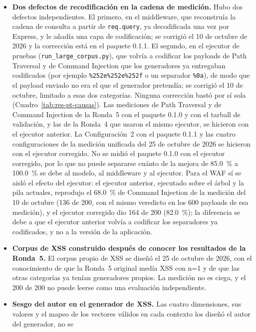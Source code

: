 \begin{itemize}
    evaluación estrictamente ciega; el paquete 0.1.1 contiene el mismo par.
    \item \textbf{Dos defectos de recodificación en la cadena de medición.} Hubo dos defectos
    independientes. El primero, en el middleware, que reconstruía la cadena de consulta a partir de
    \texttt{req.query}, ya decodificada una vez por Express, y le añadía una capa de codificación;
    se corrigió el 10 de octubre de 2026 y la corrección está en el paquete 0.1.1. El segundo, en el
    ejecutor de pruebas (\texttt{run\_large\_corpus.py}), que volvía a codificar los payloads de
    Path Traversal y de Command Injection que los generadores ya entregaban codificados (por
    ejemplo \texttt{\%252e\%252e\%252f} o un separador \texttt{\%0a}), de modo que el payload enviado
    no era el que el generador pretendía; se corrigió el 10 de octubre, limitado a esas dos
    categorías. Ninguna corrección bastó por sí sola (Cuadro~\ref{tab:res-pt-causas}). Las mediciones de
    Path Traversal y de Command Injection de la Ronda~5 con el paquete 0.1.0 y con el tarball de
    validación, y las de la Ronda~4 que usaron el mismo ejecutor, se hicieron con el ejecutor
    anterior. La Configuración~2 con el paquete 0.1.1 y las cuatro configuraciones de la medición
    unificada del 25 de octubre de 2026 se hicieron con el ejecutor corregido. No se midió el
    paquete 0.1.0 con el ejecutor corregido, por lo que no puede separarse cuánto de la mejora de
    85.0~\% a 100.0~\% se debe al modelo, al middleware y al ejecutor. Para el WAF sí se aisló el
    efecto del ejecutor: el ejecutor anterior, ejecutado sobre el árbol y la pila actuales,
    reprodujo el 68.0~\% de Command Injection de la medición del 10 de octubre (136 de 200, con el
    mismo veredicto en los 600 payloads de esa medición), y el ejecutor corregido dio 164 de 200
    (82.0~\%); la diferencia se debe a que el ejecutor anterior volvía a codificar los separadores
    ya codificados, y no a la versión de la aplicación.
        \item \textbf{Corpus de XSS construido después de conocer los resultados de la Ronda~5.} El
    corpus propio de XSS se diseñó el 25 de octubre de 2026, con el conocimiento de que la Ronda~5
    original medía XSS con n=1 y de que las otras categorías ya tenían generadores propios. La
    medición no es ciega, y el 200 de 200 no puede leerse como una evaluación independiente.
    \item \textbf{Sesgo del autor en el generador de XSS.} Las cuatro dimensiones, sus valores y el
    mapeo de los vectores válidos en cada contexto los diseñó el autor del generador, no se

\end{itemize}
